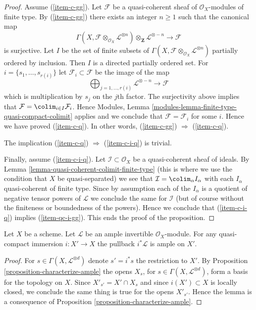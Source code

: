 \begin{proof}
\medskip\noindent
Assume (\ref{item-c-gg}). Let $\mathcal{F}$ be a quasi-coherent
sheaf of $\mathcal{O}_X$-modules of finite type.
By (\ref{item-c-gg}) there exists an integer $n \geq 1$ such that
the canonical map
$$
\Gamma(X, \mathcal{F} \otimes_{\mathcal{O}_X} \mathcal{L}^{\otimes n})
\otimes_{\mathbf{Z}} \mathcal{L}^{\otimes -n}
\longrightarrow
\mathcal{F}
$$
is surjective. Let $I$ be the set of finite subsets of
$\Gamma(X, \mathcal{F} \otimes_{\mathcal{O}_X} \mathcal{L}^{\otimes n})$
partially ordered by inclusion. Then $I$ is a directed partially ordered set.
For $i = \{s_1, \ldots, s_{r(i)}\}$ let $\mathcal{F}_i \subset \mathcal{F}$
be the image of the map
$$
\bigoplus\nolimits_{j = 1, \ldots, r(i)} \mathcal{L}^{\otimes -n}
\longrightarrow
\mathcal{F}
$$
which is multiplication by $s_j$ on the $j$th factor. The surjectivity above
implies that $\mathcal{F} = \colim_{i \in I} \mathcal{F}_i$.
Hence Modules, Lemma \ref{modules-lemma-finite-type-quasi-compact-colimit}
applies and we conclude that
$\mathcal{F} = \mathcal{F}_i$ for some $i$.
Hence we have proved (\ref{item-c-q}). In other words,
(\ref{item-c-gg}) $\Rightarrow$ (\ref{item-c-q}).

\medskip\noindent
The implication (\ref{item-c-q}) $\Rightarrow$ (\ref{item-c-i-q}) is trivial.

\medskip\noindent
Finally, assume (\ref{item-c-i-q}).
Let $\mathcal{I} \subset \mathcal{O}_X$ be a quasi-coherent sheaf
of ideals. By Lemma \ref{lemma-quasi-coherent-colimit-finite-type}
(this is where we use the condition that $X$ be quasi-separated)
we see that $\mathcal{I} = \colim_\alpha I_\alpha$ with
each $I_\alpha$ quasi-coherent of finite type. Since by assumption each of
the $I_\alpha$ is a quotient of negative tensor powers of
$\mathcal{L}$ we conclude the same for $\mathcal{I}$ (but of course
without the finiteness or boundedness of the powers). Hence
we conclude that (\ref{item-c-i-q}) implies (\ref{item-qc-i-gg}).
This ends the proof of the proposition.
\end{proof}

\begin{lemma}
\label{lemma-ample-on-locally-closed}
Let $X$ be a scheme.
Let $\mathcal{L}$ be an ample invertible $\mathcal{O}_X$-module.
For any quasi-compact immersion $i : X' \to X$ the pullback
$i^*\mathcal{L}$ is ample on $X'$.
\end{lemma}

\begin{proof}
For $s \in \Gamma(X, \mathcal{L}^{\otimes d})$ denote
$s' = i^*s$ the restriction to $X'$. By
Proposition \ref{proposition-characterize-ample}
the opens $X_s$, for $s \in \Gamma(X, \mathcal{L}^{\otimes d})$,
form a basis for the topology on $X$. Since $X'_{s'} = X' \cap X_s$
and since $i(X') \subset X$ is locally closed, we conclude
the same thing is true for the opens $X'_{s'}$. Hence
the lemma is a consequence of 
Proposition \ref{proposition-characterize-ample}.
\end{proof}




